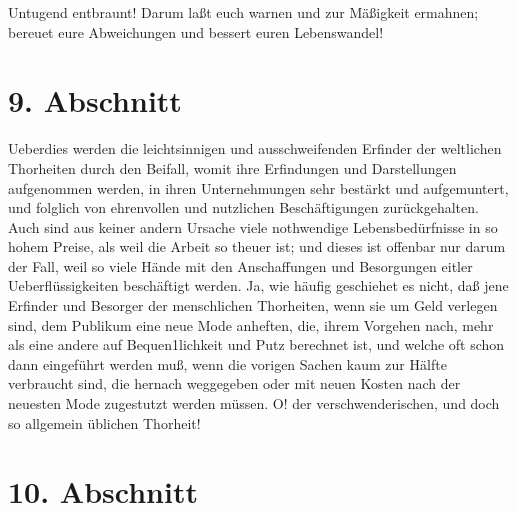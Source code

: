 Untugend entbraunt! Darum laßt euch warnen und zur Mäßigkeit ermahnen; bereuet eure Abweichungen und bessert euren Lebenswandel!

\section{9. Abschnitt}

Ueberdies werden die leichtsinnigen und ausschweifenden Erfinder der weltlichen Thorheiten durch den Beifall, womit ihre Erfindungen und Darstellungen aufgenommen werden, in ihren Unternehmungen sehr bestärkt und aufgemuntert, und folglich von ehrenvollen und nutzlichen Beschäftigungen zurückgehalten. Auch sind aus keiner andern Ursache viele nothwendige Lebensbedürfnisse in so hohem Preise, als weil die Arbeit so theuer ist; und dieses ist offenbar nur darum der Fall, weil so viele Hände mit den Anschaffungen und Besorgungen eitler Ueberflüssigkeiten beschäftigt werden. Ja, wie häufig geschiehet es nicht, daß jene Erfinder und Besorger der menschlichen Thorheiten, wenn sie um Geld verlegen sind, dem Publikum eine neue Mode anheften, die, ihrem Vorgehen nach, mehr als eine andere auf Bequen1lichkeit und Putz berechnet ist, und welche oft schon dann eingeführt werden muß, wenn die vorigen Sachen kaum zur Hälfte verbraucht sind, die hernach weggegeben oder mit neuen Kosten nach der neuesten Mode zugestutzt werden müssen. O! der verschwenderischen, und doch so allgemein üblichen Thorheit!

\section{10. Abschnitt}

